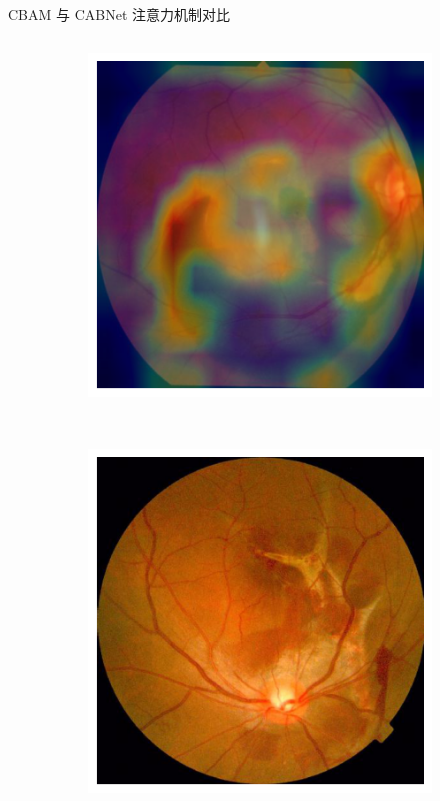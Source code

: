 \documentclass[9pt, aspectratio=1610]{beamer}
\begin{document}
\begin{frame}{CBAM 与 CABNet 注意力机制对比}
\begin{columns}
\begin{column}{0.6\textwidth}
\begin{figure}[H]
\begin{subfigure}[b]{0.2\textwidth}
                \end{subfigure}
                \hspace{2mm}
                \begin{subfigure}[b]{0.2\textwidth}
                    \raggedright
                    \includegraphics[width=\textwidth]{cabnet-heatmap-2.png}
                \end{subfigure} \\
                \vspace{2mm}
                \begin{subfigure}[b]{0.2\textwidth}
                    \raggedleft
                    \includegraphics[width=\textwidth]{image-3.png}

\end{subfigure}
\end{figure}
\end{column}
\end{columns}
\end{frame}
\end{document}
